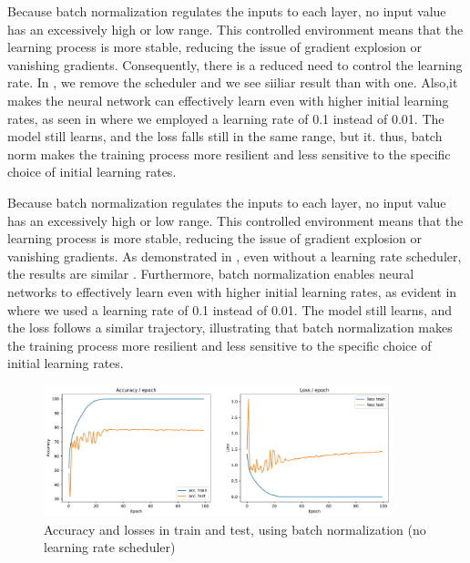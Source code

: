 Because batch normalization regulates the inputs to each layer, no input value has an excessively high or low range. This controlled environment means that the learning process is more stable, reducing the issue of gradient explosion or vanishing gradients. Consequently, there is a reduced need to control the learning rate. In , we remove the scheduler and we see siiliar result than with one.  Also,it makes the neural network can effectively learn even with higher initial learning rates, as seen in  where we employed a learning rate of 0.1 instead of 0.01. The model still learns, and the loss falls still in the same range, but it.
thus, batch norm makes the training process more resilient and less sensitive to the specific choice of initial learning rates.

Because batch normalization regulates the inputs to each layer, no input value has an excessively high or low range.  This controlled environment means that the learning process is more stable, reducing the issue of gradient explosion or vanishing gradients. As demonstrated in , even without a learning rate scheduler, the results are similar . Furthermore, batch normalization enables neural networks to effectively learn even with higher initial learning rates, as evident in  where we used a learning rate of 0.1 instead of 0.01. The model still learns, and the loss follows a similar trajectory, illustrating that batch normalization makes the training process more resilient and less sensitive to the specific choice of initial learning rates.

\begin{figure}[H]
    \centering
    \includegraphics*[width=0.9\textwidth]{figs/CNN/batchnorm_no_scheduler.pdf}
    \caption{Accuracy and losses in train and test, using batch normalization (no learning rate scheduler)}
    \label{fig:batchnorm_no_scheduler}
\end{figure}

